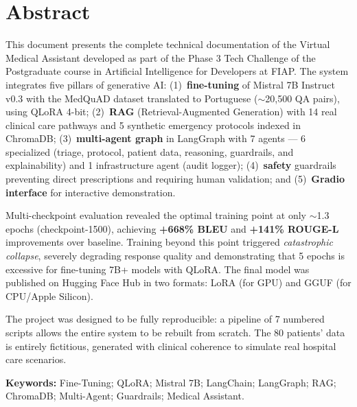 \documentclass[12pt, a4paper]{report}
\begin{document}
\chapter*{Abstract}
\vspace*{-0.3cm}

This document presents the complete technical documentation of the Virtual Medical Assistant developed as part of the Phase 3 Tech Challenge of the Postgraduate course in Artificial Intelligence for Developers at FIAP. The system integrates five pillars of generative AI: (1)~\textbf{fine-tuning} of Mistral 7B Instruct v0.3 with the MedQuAD dataset translated to Portuguese ($\sim$20,500 QA pairs), using QLoRA 4-bit; (2)~\textbf{RAG} (Retrieval-Augmented Generation) with 14 real clinical care pathways and 5 synthetic emergency protocols indexed in ChromaDB; (3)~\textbf{multi-agent graph} in LangGraph with 7 agents --- 6 specialized (triage, protocol, patient data, reasoning, guardrails, and explainability) and 1 infrastructure agent (audit logger); (4)~\textbf{safety} guardrails preventing direct prescriptions and requiring human validation; and (5)~\textbf{Gradio interface} for interactive demonstration.

Multi-checkpoint evaluation revealed the optimal training point at only $\sim$1.3 epochs (checkpoint-1500), achieving \textbf{+668\% BLEU} and \textbf{+141\% ROUGE-L} improvements over baseline. Training beyond this point triggered \textit{catastrophic collapse}, severely degrading response quality and demonstrating that 5 epochs is excessive for fine-tuning 7B+ models with QLoRA. The final model was published on Hugging Face Hub in two formats: LoRA (for GPU) and GGUF (for CPU/Apple Silicon).

The project was designed to be fully reproducible: a pipeline of 7 numbered scripts allows the entire system to be rebuilt from scratch. The 80 patients' data is entirely fictitious, generated with clinical coherence to simulate real hospital care scenarios.

\vspace{1em}
\noindent\textbf{Keywords:} Fine-Tuning; QLoRA; Mistral 7B; LangChain; LangGraph; RAG; ChromaDB; Multi-Agent; Guardrails; Medical Assistant.

\tableofcontents
\end{document}
